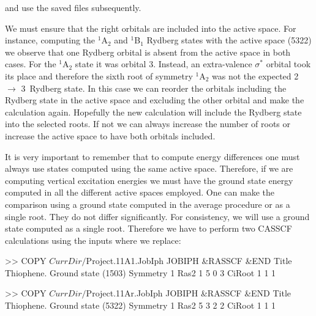 and use the saved  files subsequently.


We must ensure that the right orbitals are included into
the active space. For instance, computing the $^1$A$_2$ and
$^1$B$_1$ Rydberg states with the active space (5322) we
observe that one Rydberg orbital is absent from the active space
in both cases. For the $^1$A$_2$ state it was orbital 3\dyz.
Instead, an extra-valence $\sigma^*$ orbital took its place and
therefore the sixth root of symmetry $^1$A$_2$ was not the expected
2\bo\ $\to$ 3\dyz\ Rydberg state. In this case we can reorder
the orbitals including the Rydberg state in the active space
and excluding the other orbital and make the calculation again.
Hopefully the new calculation will include the Rydberg state
into the selected roots. If not we can always increase the
number of roots or increase the active space to have both
orbitals included.

It is very important to remember that to compute energy differences
one must always use states computed using the same active
space. Therefore, if we are computing vertical excitation energies
we must have the ground state energy computed in all the different
active spaces employed. One can make the comparison using a ground
state computed in the average procedure or as a single root. They
do not differ significantly. For consistency, we will use a ground state
computed as a single root. Therefore we have to perform two CASSCF
calculations using the inputs where we replace:

\begin{inputlisting}
>> COPY $CurrDir/$Project.11A1.JobIph JOBIPH
 &RASSCF &END
Title                                                                           
 Thiophene. Ground state (1503)
Symmetry                                                                        
    1                                                                          
Ras2
    1    5    0    3
CiRoot                                                                        
1 1
1 

>> COPY $CurrDir/$Project.11Ar.JobIph JOBIPH
 &RASSCF &END
Title                                                                           
 Thiophene. Ground state (5322)
Symmetry                                                                        
    1                                                                          
Ras2
    5    3    2    2
CiRoot                                                                        
1 1
1 
\end{inputlisting}

